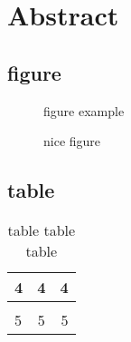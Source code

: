 \chapter*{Abstract}
\label{chap:Abstract}

\section*{figure}
\begin{figure}[h]
figure example
\caption{nice figure}
\label{fig: nice figure}
\end{figure}

\section*{table}
\begin{table}[h]
\begin{tabular}{ l c r}
4 & 4 & 4 \\
\hline \\
5 & 5 & 5 
\end{tabular}
\caption{table table table}
\label{tab:table table table}
\end{table}